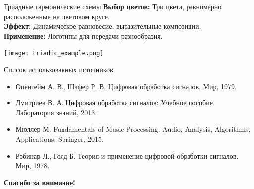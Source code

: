 \documentclass{beamer}
\begin{document}
\begin{frame}{Триадные гармонические схемы}
    \textbf{Выбор цветов:} Три цвета, равномерно расположенные на цветовом круге. \\
    \vspace{0.3cm}
    \textbf{Эффект:} Динамическое равновесие, выразительные композиции. \\
    \vspace{0.3cm}
    \textbf{Применение:} Логотипы для передачи разнообразия.
    \begin{center}
        \texttt{[image: triadic\_example.png]} %
    \end{center}
\end{frame}

\begin{frame}{Список использованных источников}
    \begin{itemize}
        \item Опенгейм А. В., Шафер Р. В. Цифровая обработка сигналов. Мир, 1979.
        \item Дмитриев В. А. Цифровая обработка сигналов: Учебное пособие. Лаборатория знаний, 2013.
        \item Мюллер М. Fundamentals of Music Processing: Audio, Analysis, Algorithms, Applications. Springer, 2015.
        \item Рэбинар Л., Голд Б. Теория и применение цифровой обработки сигналов. Мир, 1978.
    \end{itemize}
\end{frame}

\begin{frame}
    \centering
    \textbf{\huge Спасибо за внимание!}
\end{frame}
\end{document}
